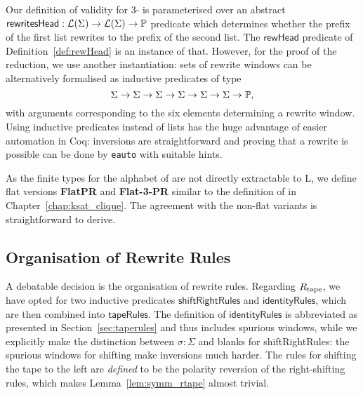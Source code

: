 Our definition of validity for 3-\PR{} is parameterised over an abstract $\textsf{rewritesHead} : \mathcal{L} (\Sigma) \rightarrow \mathcal{L} (\Sigma) \rightarrow \mathbb{P}$ predicate which determines whether the prefix of the first list rewrites to the prefix of the second list. The $\textsf{rewHead}$ predicate of Definition~\ref{def:rewHead} is an instance of that.
However, for the proof of the reduction, we use another instantiation: sets of rewrite windows can be alternatively formalised as inductive predicates of type
\[ \Sigma \rightarrow \Sigma \rightarrow \Sigma \rightarrow \Sigma \rightarrow \Sigma \rightarrow \Sigma \rightarrow \mathbb{P}, \]
with arguments corresponding to the six elements determining a rewrite window. 
Using inductive predicates instead of lists has the huge advantage of easier automation in Coq: inversions are straightforward and proving that a rewrite is possible can be done by \texttt{eauto} with suitable hints.

As  the finite types for the alphabet of \PR{} are not directly extractable to L, we define flat versions \textbf{FlatPR} and \textbf{Flat-3-PR} similar 
to the definition of \FlatClique{} in Chapter~\ref{chap:ksat_clique}.
The agreement with the non-flat variants is straightforward to derive.

\subsection{Organisation of Rewrite Rules}
A debatable decision is the organisation of rewrite rules. Regarding $R_{\text{tape}}$, we have opted for two inductive predicates $\textsf{shiftRightRules}$ and $\textsf{identityRules}$, which are then combined into $\textsf{tapeRules}$. The definition of $\textsf{identityRules}$ is abbreviated as presented in Section~\ref{sec:taperules} and thus includes spurious windows, while we explicitly make the distinction between $\sigma : \Sigma$ and blanks for \textsf{shiftRightRules}: the spurious windows for shifting make inversions much harder. 
The rules for shifting the tape to the left are \emph{defined} to be the polarity reversion of the right-shifting rules, which makes Lemma~\ref{lem:symm_rtape} almost trivial.

